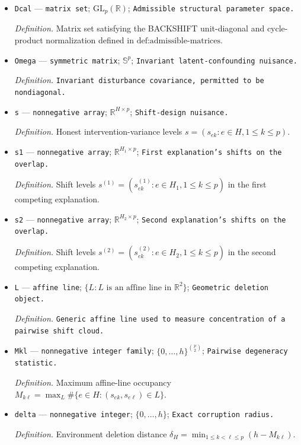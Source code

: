 \documentclass{article}
\begin{document}
\begin{itemize}
  \item \texttt{Dcal} --- \texttt{matrix set}; \(\mathrm{GL}_{p}(\mathbb R)\); \texttt{Admissible structural parameter space.}
  \par\smallskip\noindent\emph{Definition.} Matrix set satisfying the BACKSHIFT unit-diagonal and cycle-product normalization defined in \(\text{def:admissible-matrices}\).
  \item \texttt{Omega} --- \texttt{symmetric matrix}; \(\mathbb S^{p}\); \texttt{Invariant latent-\allowbreak{}confounding nuisance.}
  \par\smallskip\noindent\emph{Definition.} \texttt{Invariant disturbance covariance,\allowbreak{} permitted to be nondiagonal.}
  \item \texttt{s} --- \texttt{nonnegative array}; \(\mathbb R^{H\times p}\); \texttt{Shift-\allowbreak{}design nuisance.}
  \par\smallskip\noindent\emph{Definition.} Honest intervention-variance levels \(s=(s_{ek}:e\in H,1\le k\le p)\).
  \item \texttt{s1} --- \texttt{nonnegative array}; \(\mathbb R^{H_1\times p}\); \texttt{First explanation's shifts on the overlap.}
  \par\smallskip\noindent\emph{Definition.} Shift levels \(s^{(1)}=(s^{(1)}_{ek}:e\in H_1,1\le k\le p)\) in the first competing explanation.
  \item \texttt{s2} --- \texttt{nonnegative array}; \(\mathbb R^{H_2\times p}\); \texttt{Second explanation's shifts on the overlap.}
  \par\smallskip\noindent\emph{Definition.} Shift levels \(s^{(2)}=(s^{(2)}_{ek}:e\in H_2,1\le k\le p)\) in the second competing explanation.
  \item \texttt{L} --- \texttt{affine line}; \(\{L:L\text{ is an affine line in }\mathbb R^2\}\); \texttt{Geometric deletion object.}
  \par\smallskip\noindent\emph{Definition.} \texttt{Generic affine line used to measure concentration of a pairwise shift cloud.}
  \item \texttt{Mkl} --- \texttt{nonnegative integer family}; \(\{0,\ldots,h\}^{\binom p2}\); \texttt{Pairwise degeneracy statistic.}
  \par\smallskip\noindent\emph{Definition.} Maximum affine-line occupancy \(M_{k\ell}=\max_L\#\{e\in H:(s_{ek},s_{e\ell})\in L\}\).
  \item \texttt{delta} --- \texttt{nonnegative integer}; \(\{0,\ldots,h\}\); \texttt{Exact corruption radius.}
  \par\smallskip\noindent\emph{Definition.} Environment deletion distance \(\delta_H=\min_{1\le k<\ell\le p}(h-M_{k\ell})\).

\end{itemize}
\end{document}
